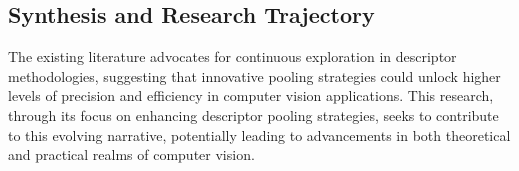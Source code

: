 \subsection{Synthesis and Research Trajectory}

The existing literature advocates for continuous exploration in descriptor methodologies, suggesting that innovative pooling strategies could unlock higher levels of precision and efficiency in computer vision applications. This research, through its focus on enhancing descriptor pooling strategies, seeks to contribute to this evolving narrative, potentially leading to advancements in both theoretical and practical realms of computer vision.